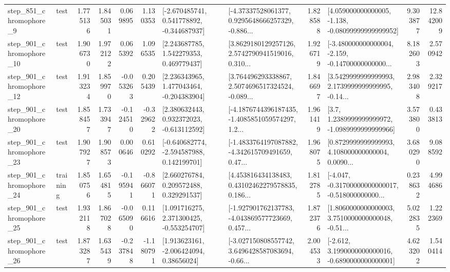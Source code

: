 \begin{tabular}{llrrrrllrlrr}
   step\_851\_chromophore\_9 &      test &      1.775136 &    1.845031 &      0.069895 &  1.130353 &   [-2.670485741, 0.541778892, -0.344687937] &  [-4.37337528061377, 0.9295648666257329, -0.886... &       1.828588 &  [4.059000000000005, -1.138, -0.08099999999999952] &            9.303877 &         12.842009 \\
  step\_901\_chromophore\_10 &      test &      1.906730 &    1.972122 &      0.065392 &  1.096535 &     [2.243687785, 1.542279353, 0.469779437] &  [3.8629180129257126, 2.5742790941519016, 0.310... &       1.926719 &  [-3.480000000000004, -2.159, -0.14700000000000... &            8.182603 &          2.570942 \\
  step\_901\_chromophore\_12 &      test &      1.913234 &    1.859970 &     -0.053263 &  0.205439 &    [2.236343965, 1.477043464, -0.204383904] &  [3.764496293338867, 2.5074696517324524, -0.089... &       1.846697 &  [3.5429999999999993, 2.1739999999999995, -0.14... &            2.983408 &          2.329217 \\
  step\_901\_chromophore\_20 &      test &      1.858457 &    1.733947 &     -0.124510 & -0.329622 &    [2.380632443, 0.932372023, -0.613112592] &  [-4.1876744396187435, -1.4085851059574297, 1.2... &       1.961419 &     [3.7, 1.2389999999999972, -1.0989999999999966] &            3.573800 &          0.433813 \\
  step\_901\_chromophore\_23 &      test &      1.907927 &    1.908573 &      0.000646 &  0.610292 &   [-0.640682774, -2.594587988, 0.142199701] &  [-1.4833764197087882, -4.342615709491659, 0.47... &       1.968075 &  [0.8729999999999993, 4.108000000000004, 0.0090... &            3.680290 &          9.088592 \\
  step\_901\_chromophore\_24 &  training &      1.850756 &    1.654815 &     -0.195941 & -0.866071 &     [2.660276784, 0.209572488, 0.329291537] &  [4.453816434138483, 0.43102462279578835, 0.186... &       1.812785 &  [-4.047, -0.31700000000000017, -0.518000000000... &            0.238632 &          4.994686 \\
  step\_901\_chromophore\_25 &      test &      1.932118 &    1.867028 &     -0.065090 &  0.116616 &    [1.091716275, 2.371300425, -0.553254707] &  [-1.927901762137783, -4.043869577723669, 0.457... &       1.872376 &  [1.8060000000000003, 3.7510000000000048, -0.51... &            5.022835 &          1.222369 \\
  step\_901\_chromophore\_26 &      test &      1.873287 &    1.635439 &     -0.237848 & -1.180791 &     [1.913623161, -2.006424094, 0.38656024] &  [-3.027150808557742, 3.6496428587083694, -0.66... &       2.004533 &  [-2.612, 3.1990000000000016, -0.6890000000000001] &            4.623202 &          1.540414 \\

\end{tabular}
